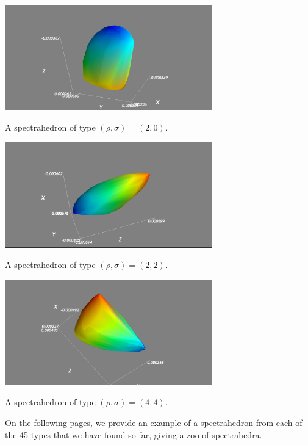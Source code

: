 \documentclass[12pt]{amsart}
\theoremstyle{plain}
\theoremstyle{definition}
\begin{document}
\begin{center}
\includegraphics[height=1.8in]{0200}

{\small A spectrahedron of type $(\rho,\sigma) = (2,0)$.}
\end{center}

\bigskip

\begin{center}
\includegraphics[height=1.8in]{0202}

{\small A spectrahedron of type $(\rho,\sigma) = (2,2)$.}
\end{center}

\bigskip

\begin{center}
\includegraphics[height=1.8in]{0404}

{\small A spectrahedron of type $(\rho,\sigma) = (4,4)$.}
\end{center}

\bigskip







On the following pages, we provide an example of a spectrahedron from each of
the 45 types that we have found so far, giving a zoo of spectrahedra.
\end{document}
